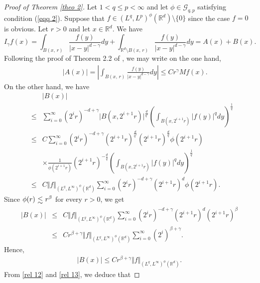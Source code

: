 \documentclass[a4paper,12pt,intlimits,oneside]{amsart}
\numberwithin{equation}{section}
\numberwithin{equation}{section}
\def\lsim{\raisebox{-1ex}{$~\stackrel{\textstyle <}{\sim}~$}}
\theoremstyle{definition}
\begin{document}
\begin{proof}[Proof of Theorem \ref{theo 2}]
Let $1 < q\leq p < \infty$ and let $\phi\in \mathcal{G}_{q,p}$ satisfying condition (\ref{eqq 2}). Suppose that $f \in (L^{q},L^{p})^{\phi}(\mathbb{R}^{d})\setminus \{ 0 \}$ since the case $f=0$ is obvious. Let $r>0$ and let $x \in \mathbb{R}^{d}$. We have
$$ I_{\gamma} f(x)=\displaystyle\int_{B(x,\, r)}\frac{f(y)}{\left|x-y\right|^{d-\gamma}}dy+\displaystyle\int_{\mathbb{R}^{d}\setminus B(x,\, r)}\frac{f(y)}{\left|x-y\right|^{d-\gamma}}dy = A(x) + B(x) .  $$
Following the proof of Theorem 2.2 of \cite{GE}, we may write on the one hand,
\begin{eqnarray} \label{rel 12}
& & \vert A(x) \vert= \left\vert \displaystyle\int_{B(x,\, r)}\frac{f(y)}{\left|x-y\right|^{d-\gamma}}dy \right\vert \leq C r^{\gamma} M f(x).
\end{eqnarray}
On the other hand, we have
\begin{eqnarray*}
& &\vert B(x) \vert  \\
& \leq & \sum\limits^{\infty}_{i=0} (2^{i}r)^{-d+\gamma} \vert B(x,2^{i+1}r) \vert^{\frac{d}{q'}} \left( \displaystyle\int_{B(x,2^{i+1}r)} \vert f(y)\vert^{q} dy\right)^{\frac{1}{q}}\\
 &\leq & C \sum\limits^{\infty}_{i=0} (2^{i}r)^{-d+\gamma} (2^{i+1}r)^{\frac{d}{q'}}(2^{i+1}r)^{\frac{d}{q}} \phi(2^{i+1}r) \\ & & \times \frac{1}{\phi(2^{i+1}r)}(2^{i+1}r)^{-\frac{d}{q}}\left( \displaystyle\int_{B(x,2^{i+1}r)} \vert f(y)\vert^{q} dy\right)^{\frac{1}{q}}\\
 &\leq & C \Vert f \Vert_{(L^{q},L^{\infty})^{\phi}(\mathbb{R}^{d})}\sum\limits^{\infty}_{i=0} (2^{i}r)^{-d+\gamma} (2^{i+1}r)^{d} \phi(2^{i+1}r).
\end{eqnarray*}
Since $\phi(r) \lsim  r^{\beta}$ for every $r > 0$, we get
\begin{eqnarray*} 
\vert B(x) \vert &\leq & C \Vert f \Vert_{(L^{q},L^{\infty})^{\phi}(\mathbb{R}^{d})}\sum\limits^{\infty}_{i=0} (2^{i}r)^{-d+\gamma} (2^{i+1}r)^{d} (2^{i+1}r)^{\beta}\\&\leq & C r^{\beta +\gamma}\Vert f \Vert_{(L^{q},L^{\infty})^{\phi}(\mathbb{R}^{d})}\sum\limits^{\infty}_{i=0} (2^{i})^{\beta +\gamma}.
\end{eqnarray*}
Hence,
\begin{eqnarray}\label{rel 13}
\vert B(x) \vert \leq C r^{\beta +\gamma}\Vert f \Vert_{(L^{q},L^{\infty})^{\phi}(\mathbb{R}^{d})}.
\end{eqnarray}
From \eqref{rel 12} and \eqref{rel 13}, we deduce that

\end{proof}
\end{document}
